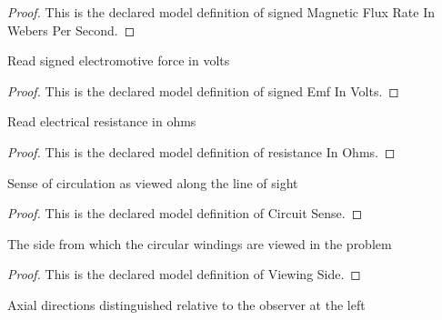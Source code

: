 \begin{proof}
  This is the declared model definition of signed Magnetic Flux Rate In Webers Per Second.
\end{proof}
\begin{definition}
  \label{def:physics:phyx-mini-0930:phyxminiproblems-problemphyxmini0930-signedemfinvolts}
  Read signed electromotive force in volts
\end{definition}
\begin{proof}
  This is the declared model definition of signed Emf In Volts.
\end{proof}
\begin{definition}
  \label{def:physics:phyx-mini-0930:phyxminiproblems-problemphyxmini0930-resistanceinohms}
  Read electrical resistance in ohms
\end{definition}
\begin{proof}
  This is the declared model definition of resistance In Ohms.
\end{proof}
\begin{definition}
  \label{def:physics:phyx-mini-0930:phyxminiproblems-problemphyxmini0930-circuitsense}
  Sense of circulation as viewed along the line of sight
\end{definition}
\begin{proof}
  This is the declared model definition of Circuit Sense.
\end{proof}
\begin{definition}
  \label{def:physics:phyx-mini-0930:phyxminiproblems-problemphyxmini0930-viewingside}
  The side from which the circular windings are viewed in the problem
\end{definition}
\begin{proof}
  This is the declared model definition of Viewing Side.
\end{proof}
\begin{definition}
  \label{def:physics:phyx-mini-0930:phyxminiproblems-problemphyxmini0930-solenoidaxialdirection}
  Axial directions distinguished relative to the observer at the left
\end{definition}
